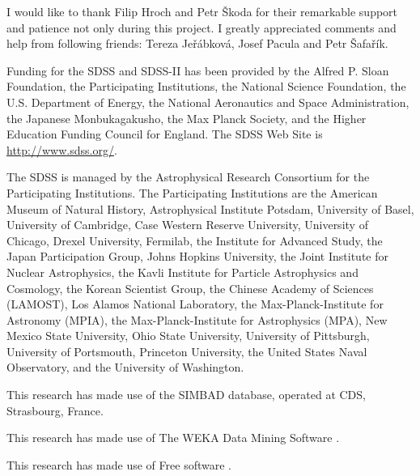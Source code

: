 

\begin{acknowledgements}      %


  I would like to thank Filip Hroch and Petr \v{S}koda for their
  remarkable support and patience not only during this project. I
  greatly appreciated comments and help from following friends: Tereza
  Je\v{r}\'{a}bkov\'{a}, Josef Pacula and Petr \v{S}afa\v{r}\'{i}k.

  \bigskip 
  Funding for the SDSS and SDSS-II has been provided by the
  Alfred P. Sloan Foundation, the Participating Institutions, the
  National Science Foundation, the U.S. Department of Energy, the
  National Aeronautics and Space Administration, the Japanese
  Monbukagakusho, the Max Planck Society, and the Higher Education
  Funding Council for England. The SDSS Web Site is
  \url{http://www.sdss.org/}.

  The SDSS is managed by the Astrophysical Research Consortium for the
  Participating Institutions. The Participating Institutions are the
  American Museum of Natural History, Astrophysical Institute Potsdam,
  University of Basel, University of Cambridge, Case Western Reserve
  University, University of Chicago, Drexel University, Fermilab, the
  Institute for Advanced Study, the Japan Participation Group, Johns
  Hopkins University, the Joint Institute for Nuclear Astrophysics,
  the Kavli Institute for Particle Astrophysics and Cosmology, the
  Korean Scientist Group, the Chinese Academy of Sciences (LAMOST),
  Los Alamos National Laboratory, the Max-Planck-Institute for
  Astronomy (MPIA), the Max-Planck-Institute for Astrophysics (MPA),
  New Mexico State University, Ohio State University, University of
  Pittsburgh, University of Portsmouth, Princeton University, the
  United States Naval Observatory, and the University of Washington.

  \bigskip

  This research has made use of the SIMBAD database, operated at CDS,
  Strasbourg, France.

  \bigskip

  This research has made use of The WEKA Data Mining Software
  \citep{hall2009weka}.

  \bigskip

  This research has made use of Free software \citep{GPL}.




\end{acknowledgements}


